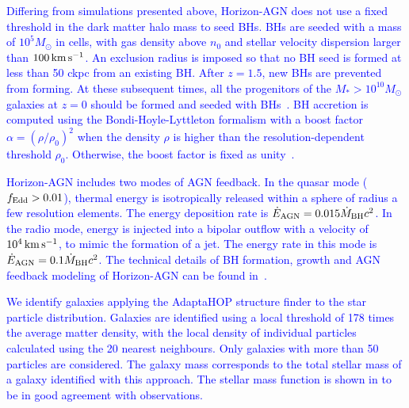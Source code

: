 \documentclass[twocolumn]{aastex631}
\newcommand{\blue}[1]{\textcolor{blue}{#1}}
\def\smass{{$M_*$}}
\begin{document}
\blue{Differing from simulations presented above, Horizon-AGN does not use a fixed threshold in the dark matter halo mass to seed BHs.  BHs are seeded with a mass of $10^5 M_\odot$ in cells, with gas density above $n_0$ and stellar velocity dispersion larger than $100 \,\rm km\,s^{-1}$. An exclusion radius is imposed so that no BH seed is formed at less than 50 ckpc from an existing BH. After $z = 1.5$, new BHs are prevented from forming. At these subsequent times, all the progenitors of the \smass$>10^{10} M_{\odot}$ galaxies at $z = 0$ should be formed and seeded with BHs~\citep{2016MNRAS.460.2979V}.  BH accretion is computed using the Bondi-Hoyle-Lyttleton formalism with a boost factor $\alpha = (\rho/\rho_0)^2$ when the density $\rho$ is higher than the resolution-dependent threshold $\rho_0$. Otherwise, the boost factor is fixed as unity~\citep{2009MNRAS.398...53B}.}

\blue{Horizon-AGN includes two modes of AGN feedback. In the quasar mode ($f_{\rm Edd}>0.01$), thermal energy is isotropically released within a sphere of radius a few resolution elements. The energy deposition rate is $\dot{E}_{\rm AGN} = 0.015 \dot{M}_{\rm BH} c^2$. In the radio mode, energy is injected into a bipolar  outflow  with  a  velocity  of  $10^4\,\rm km\,s^{-1}$, to  mimic the  formation  of  a  jet.  The  energy  rate  in  this  mode is $\dot{E}_{\rm AGN} = 0.1 \dot{M}_{\rm BH} c^2$.  The  technical  details  of  BH  formation,  growth  and AGN  feedback  modeling  of  Horizon-AGN  can be found in~\citet{2012MNRAS.420.2662D}.} 

\blue{We identify galaxies applying the AdaptaHOP structure finder \citep{Aubert+04,Tweed+09} to the star particle distribution.  Galaxies are identified using a local threshold of 178 times the average matter density, with the local density of individual particles calculated using the 20 nearest neighbours. Only galaxies with more than 50 particles are considered. The galaxy mass corresponds to the total stellar mass of a galaxy identified with this approach. The stellar mass function is shown in \cite{2017MNRAS.467.4739K} to be in good agreement with observations.}


\end{document}
